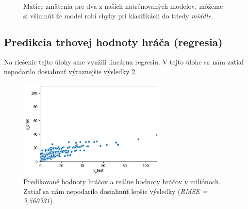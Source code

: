 \documentclass[runningheads]{llncs}
\begin{document}
\begin{figure}%
    \centering
    \qquad
    \caption{Matice zmätenia pre dva z našich natrénovaných modelov, môžeme si všimnúť že model robí chyby pri klasifikácii do triedy \textit{middle}.}%
    \label{fig:confusion_matrix_position_4}%
\end{figure}

\subsection{Predikcia trhovej hodnoty hráča (regresia)}

Na riešenie tejto úlohy sme využili lineárnu regresiu. V tejto úlohe sa nám zatiaľ nepodarilo dosiahnuť výraznejšie výsledky \ref{fig:value_pred_true_scatterplot}.

\begin{figure}[htp]
    \centering
    \includegraphics[height=5cm]{images/value_pred_true_scatterplot}
    \caption{Predikované hodnoty hráčov a reálne hodnoty hráčov v miliónoch. Zatiaľ sa nám nepodarilo dosiahnúť lepšie výsledky (\textit{RMSE = 3,560331}).}
    \label{fig:value_pred_true_scatterplot}
\end{figure}



\end{document}
